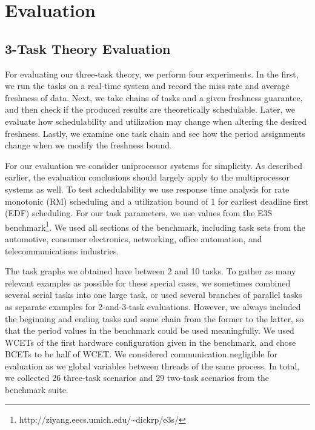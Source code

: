 \section{Evaluation}

\subsection{3-Task Theory Evaluation}

For evaluating our three-task theory, we perform four experiments. In the first, we run the tasks on a real-time system and record the miss rate and average freshness of data. Next, we take chains of tasks and a given freshness guarantee, and then check if the produced results are theoretically schedulable. Later, we evaluate how schedulability and utilization may change when altering the desired freshness. Lastly, we examine one task chain and see how the period assignments change when we modify the freshness bound.

For our evaluation we consider uniprocessor systems for simplicity. As described earlier, the evaluation conclusions should largely apply to the multiprocessor systems as well. To test schedulability we use response time analysis for rate monotonic (RM) scheduling and a utilization bound of 1 for earliest deadline first (EDF) scheduling. For our task parameters, we use values from the E3S benchmark\footnote{http://ziyang.eecs.umich.edu/\textasciitilde dickrp/e3s/}. We used all sections of the benchmark, including task sets from the automotive, consumer electronics, networking, office automation, and telecommunications industries.

The task graphs we obtained have between 2 and 10 tasks. To gather as many relevant examples as possible for these special cases, we sometimes combined several serial tasks into one large task, or used several branches of parallel tasks as separate examples for 2-and-3-task evaluations. However, we always included the beginning and ending tasks and some chain from the former to the latter, so that the period values in the benchmark could be used meaningfully. We used WCETs of the first hardware configuration given in the benchmark, and chose BCETs to be half of WCET. We considered communication negligible for evaluation as we global variables between threads of the same process. In total, we collected 26 three-task scenarios and 29 two-task scenarios from the benchmark suite.

